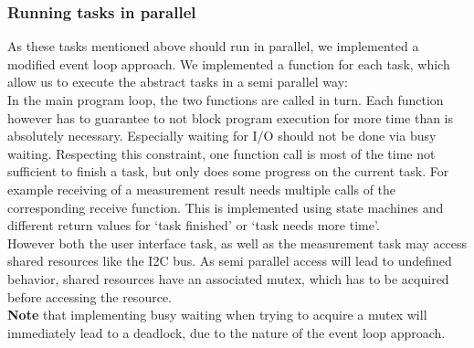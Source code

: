 \documentclass[a4paper]{scrreprt}
\begin{document}
\subsubsection{Running tasks in parallel}
As these tasks mentioned above should run in parallel, we implemented a modified event loop approach. We
implemented a function for each task, which allow us to execute the abstract tasks
in a semi parallel way:\\
In the main program loop, the two functions are called in turn. Each function however has to guarantee to
not block program execution for more time than is absolutely necessary. Especially waiting for I/O
should not be done via busy waiting. Respecting this constraint, one function
call is most of the time not sufficient to finish a task, but only does some progress on the
current task. For example receiving of a measurement result needs multiple calls
of the corresponding receive function. This is implemented using state machines and different
return values for `task finished' or `task needs more time'.\\
However both the user interface task, as well as the measurement task may access shared resources
like the I2C bus. As semi parallel access will lead to undefined behavior, shared resources
have an associated mutex, which has to be acquired before accessing the resource.\\
\textbf{Note} that implementing
busy waiting when trying to acquire a mutex will immediately lead to a deadlock, due to the nature
of the event loop approach.
\end{document}
